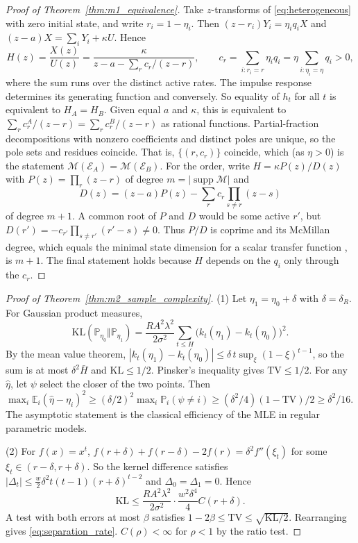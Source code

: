 \documentclass[10pt,twocolumn,letterpaper]{article}
\theoremstyle{definition}
\theoremstyle{remark}
\begin{document}
\begin{proof}[Proof of Theorem~\ref{thm:m1_equivalence}]
Take $z$-transforms of \eqref{eq:heterogeneous} with zero initial state, and write $r_i=1-\eta_i$. Then $(z-r_i)Y_i=\eta_iq_iX$ and $(z-a)X=\sum_iY_i+\kappa U$. Hence
\[
 H(z)=\frac{X(z)}{U(z)}=\frac{\kappa}{z-a-\sum_r c_r/(z-r)},\qquad c_r=\sum_{i:r_i=r}\eta_iq_i=\eta\sum_{i:\eta_i=\eta}q_i>0,
\]
where the sum runs over the distinct active rates. The impulse response determines its generating function and conversely. So equality of $h_t$ for all $t$ is equivalent to $H_A=H_B$. Given equal $a$ and $\kappa$, this is equivalent to $\sum_rc^A_r/(z-r)=\sum_rc^B_r/(z-r)$ as rational functions. Partial-fraction decompositions with nonzero coefficients and distinct poles are unique, so the pole sets and residues coincide. That is, $\{(r,c_r)\}$ coincide, which (as $\eta>0$) is the statement $\mathcal M(\mathcal E_A)=\mathcal M(\mathcal E_B)$. For the order, write $H=\kappa P(z)/D(z)$ with $P(z)=\prod_r(z-r)$ of degree $m=|\operatorname{supp}\mathcal M|$ and
\[
 D(z)=(z-a)P(z)-\sum_rc_r\prod_{s\ne r}(z-s)
\]
of degree $m+1$. A common root of $P$ and $D$ would be some active $r'$, but $D(r')=-c_{r'}\prod_{s\ne r'}(r'-s)\ne0$. Thus $P/D$ is coprime and its McMillan degree, which equals the minimal state dimension for a scalar transfer function \citep{kalman1960}, is $m+1$. The final statement holds because $H$ depends on the $q_i$ only through the $c_r$.
\end{proof}

\begin{proof}[Proof of Theorem~\ref{thm:m2_sample_complexity}]
(1) Let $\eta_1=\eta_0+\delta$ with $\delta=\delta_R$. For Gaussian product measures,
\[
\mathrm{KL}(\mathbb P_{\eta_0}\Vert\mathbb P_{\eta_1})=\frac{RA^2\lambda^2}{2\sigma^2}\sum_{t\le H}\big(k_t(\eta_1)-k_t(\eta_0)\big)^2 .
\]
By the mean value theorem, $|k_t(\eta_1)-k_t(\eta_0)|\le\delta\,t\sup_\xi(1-\xi)^{t-1}$, so the sum is at most $\delta^2\bar H$ and $\mathrm{KL}\le1/2$. Pinsker's inequality gives $\mathrm{TV}\le1/2$. For any $\hat\eta$, let $\psi$ select the closer of the two points. Then $\max_i\mathbb E_i(\hat\eta-\eta_i)^2\ge(\delta/2)^2\max_i\mathbb P_i(\psi\ne i)\ge(\delta^2/4)(1-\mathrm{TV})/2\ge\delta^2/16$. The asymptotic statement is the classical efficiency of the MLE in regular parametric models.

(2) For $f(x)=x^t$, $f(r+\delta)+f(r-\delta)-2f(r)=\delta^2f''(\xi_t)$ for some $\xi_t\in(r-\delta,r+\delta)$. So the kernel difference satisfies $|\Delta_t|\le\tfrac w2\delta^2t(t-1)(r+\delta)^{t-2}$ and $\Delta_0=\Delta_1=0$. Hence
\[
\mathrm{KL}\le\frac{RA^2\lambda^2}{2\sigma^2}\cdot\frac{w^2\delta^4}{4}C(r+\delta).
\]
A test with both errors at most $\beta$ satisfies $1-2\beta\le\mathrm{TV}\le\sqrt{\mathrm{KL}/2}$. Rearranging gives \eqref{eq:separation_rate}. $C(\rho)<\infty$ for $\rho<1$ by the ratio test.
\end{proof}
\end{document}
